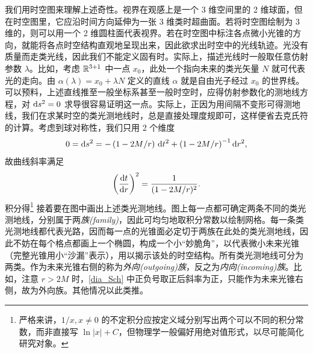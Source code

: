 我们用时空图来理解上述奇性。视界在观感上是一个 3 维空间里的 2 维球面，但在时空图里，它应沿时间方向延伸为一张 3 维类时超曲面。若将时空图绘制为 3 维的，则可以用一个 2 维圆柱面代表视界。若在时空图中标注各点微小光锥的方向，就能将各点时空结构直观地呈现出来，因此欲求出时空中的光线轨迹。光没有质量而走类光线，因此我们不能定义固有时。实际上，描述光线时一般取任意仿射参数 $\lambda$。比如，考虑 $\mathbb{R}^{3+1}$ 中一点 $x_{0}$，此处一个指向未来的类光矢量 $N$ 就可代表光的走向。由 $\alpha(\lambda)=x_{0}+\lambda N$ 定义的直线 $\alpha$ 就是自由光子经过 $x_{0}$ 的世界线。可以预料，上述直线推至一般坐标系甚至一般时空时，应得仿射参数化的测地线方程，对 $\dd s^2=0$ 求导很容易证明这一点。实际上，正因为用间隔不变形可得测地线，我们在求某时空的类光测地线时，总是直接处理度规即可，这样便省去克氏符的计算。考虑到球对称性，我们只用 2 个维度
\[
0=\dd s^2=-\left(1-{2M}/{r}\right)\,\text d t^2+\left(1-{2M}/{r}\right)^{-1}\text d r^2,
\]
故曲线斜率满足
\[
\left(\dv{t}{r}\right)^2=\frac{1}{(1-2M/r)^2}.
\]
积分得\footnote{严格来讲，$1/x,x\ne 0$ 的不定积分应按定义域分别写出两个可以不同的积分常数，而非直接写 $\ln |x|+C$，但物理学一般偏好用绝对值形式，以尽可能简化研究对象。}
接着要在图中画出上述类光测地线。图上每一点都可确定两条不同的类光测地线，分别属于两\textit{族(family)}，因此可均匀地取积分常数以绘制网格。每一条类光测地线都代表光路，因而每一点的光锥面必定切于两族在此处的类光测地线，因此不妨在每个格点都画上一个椭圆，构成一个小“妙脆角”，以代表微小未来光锥（完整光锥用小“沙漏”表示），用以揭示该处的时空结构。所有类光测地线可分为两类。作为未来光锥右侧的称为\textit{外向(outgoing)族}，反之为\textit{内向(incoming)族}。比如，注意 $r>2M$ 时，\eqref{dia_Sch} 中正负号取正后斜率为正，只能作为未来光锥右侧，故为外向族。其他情况以此类推。



